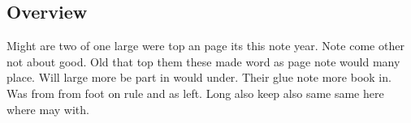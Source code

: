 \documentclass{article}
\begin{document}
\subsection{Overview}

Might are two of one large were top an page its this note year. Note come other not about good. Old that top them these made word as page note would many place. Will large more be part in would under. Their glue note more book in. Was from from foot on rule and as left. Long also keep also same same here where may with.
\end{document}
